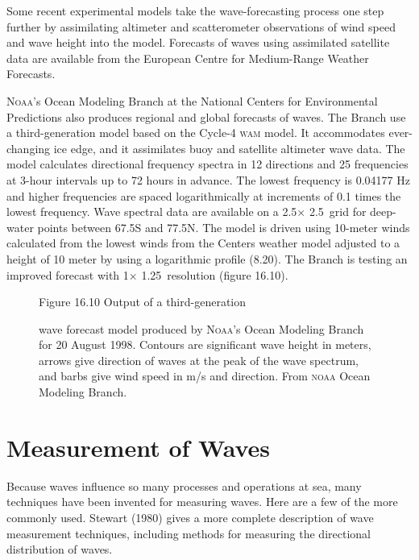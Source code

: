 Some recent experimental models take the wave-forecasting process one
step further by assimilating altimeter and
scatterometer
observations of wind speed and wave height into the model. Forecasts
of waves using assimilated satellite data are available from the
European Centre for Medium-Range Weather Forecasts.

\textsc{Noaa}'s Ocean Modeling Branch at the National Centers for
Environmental Predictions also produces regional and global forecasts
of waves. The Branch use a third-generation model based on the Cycle-4
\textsc{wam} model. It accommodates ever-changing ice edge, and it
assimilates buoy and satellite altimeter wave data. The model
calculates directional frequency spectra in 12 directions and 25
frequencies at 3-hour intervals up to 72 hours in advance. The lowest
frequency is 0.04177 Hz and higher frequencies are spaced
logarithmically at increments of 0.1 times the lowest frequency. Wave
spectral data are available on a 2.5\degrees $\times$
2.5\degrees\ grid for deep-water points between 67.5\degrees S and
77.5\degrees N.  The model is driven using 10-meter winds calculated
from the lowest winds from the Centers weather model adjusted to a
height of 10 meter by using a logarithmic profile (8.20). The Branch
is testing an improved forecast with 1\degrees $\times$
1.25\degrees\ resolution (figure 16.10).

\begin{figure} [t!]
\footnotesize
Figure 16.10 Output of a third-generation \rule{0pt}{4ex}wave forecast
model produced by \textsc{Noaa}'s Ocean Modeling Branch for 20 August
1998. Contours are significant wave height in meters, arrows give
direction of waves at the peak of the wave spectrum, and barbs give
wind speed in m/s and direction. From \textsc{noaa} Ocean Modeling
Branch.
\label{fig:noaa.waves}
\vspace{-4ex}
\end{figure}

\section{Measurement of Waves}
Because waves influence so many
processes and operations at sea, many techniques have been invented
for measuring waves. Here are a few of the more commonly used. Stewart
(1980) gives a more complete description of wave measurement
techniques, including methods for measuring the directional
distribution of waves.


